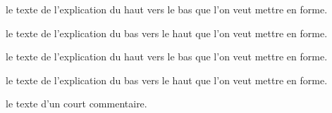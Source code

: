\documentclass[12pt,a4paper]{article}
\begin{document}
\separation



\IDarg{} le texte de l'explication du haut vers le bas que l'on veut mettre en forme.


\separation



\IDarg{} le texte de l'explication du bas vers le haut que l'on veut mettre en forme.


\separation



 le texte de l'explication du haut vers le bas que l'on veut mettre en forme.

 le texte de l'explication du bas vers le haut que l'on veut mettre en forme.


\separation



\IDarg{} le texte d'un court commentaire.
\end{document}
